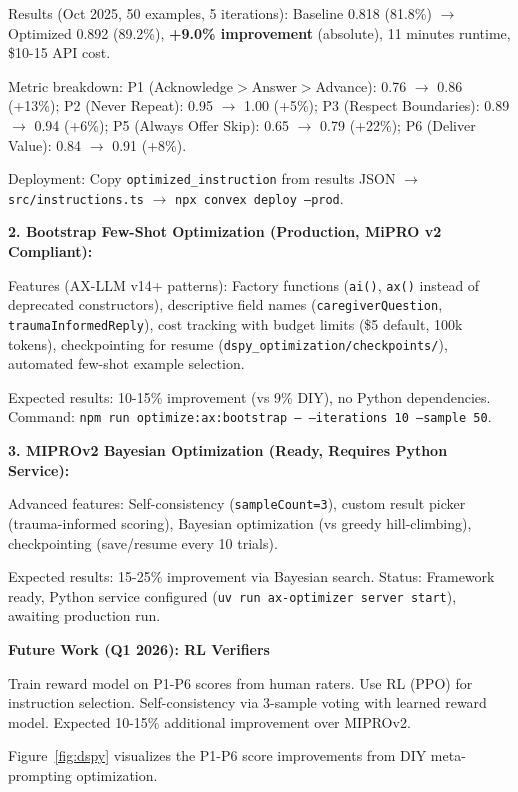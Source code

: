 \documentclass{article}%
\begin{document}
Results (Oct 2025, 50 examples, 5 iterations): Baseline 0.818 (81.8\%) $\rightarrow$ Optimized 0.892 (89.2\%), \textbf{+9.0\% improvement} (absolute), 11 minutes runtime, \$10-15 API cost.

Metric breakdown: P1 (Acknowledge$>$Answer$>$Advance): 0.76 $\rightarrow$ 0.86 (+13\%); P2 (Never Repeat): 0.95 $\rightarrow$ 1.00 (+5\%); P3 (Respect Boundaries): 0.89 $\rightarrow$ 0.94 (+6\%); P5 (Always Offer Skip): 0.65 $\rightarrow$ 0.79 (+22\%); P6 (Deliver Value): 0.84 $\rightarrow$ 0.91 (+8\%).

Deployment: Copy \texttt{optimized\_instruction} from results JSON $\rightarrow$ \texttt{src/instructions.ts} $\rightarrow$ \texttt{npx convex deploy --prod}.

\textbf{2. Bootstrap Few-Shot Optimization (Production, MiPRO v2 Compliant):}

Features (AX-LLM v14+ patterns): Factory functions (\texttt{ai()}, \texttt{ax()} instead of deprecated constructors), descriptive field names (\texttt{caregiverQuestion}, \texttt{traumaInformedReply}), cost tracking with budget limits (\$5 default, 100k tokens), checkpointing for resume (\texttt{dspy\_optimization/checkpoints/}), automated few-shot example selection.

Expected results: 10-15\% improvement (vs 9\% DIY), no Python dependencies. Command: \texttt{npm run optimize:ax:bootstrap -- --iterations 10 --sample 50}.

\textbf{3. MIPROv2 Bayesian Optimization (Ready, Requires Python Service):}

Advanced features: Self-consistency (\texttt{sampleCount=3}), custom result picker (trauma-informed scoring), Bayesian optimization (vs greedy hill-climbing), checkpointing (save/resume every 10 trials).

Expected results: 15-25\% improvement via Bayesian search. Status: Framework ready, Python service configured (\texttt{uv run ax-optimizer server start}), awaiting production run.

\textbf{Future Work (Q1 2026): RL Verifiers}

Train reward model on P1-P6 scores from human raters. Use RL (PPO) for instruction selection. Self-consistency via 3-sample voting with learned reward model. Expected 10-15\% additional improvement over MIPROv2.

Figure~\ref{fig:dspy} visualizes the P1-P6 score improvements from DIY meta-prompting optimization.
\end{document}
